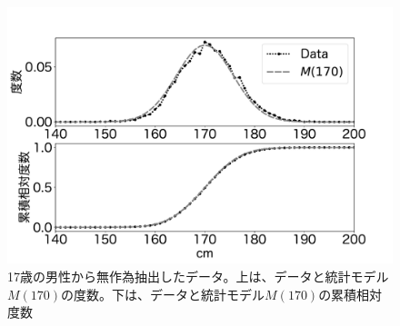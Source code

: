 \begin{figure}
\begin{center}
    \includegraphics[width=15cm]{./image/03_/cm_data.pdf}
    \caption{17歳の男性から無作為抽出したデータ。上は、データと統計モデル$M(170)$の度数。下は、データと統計モデル$M(170)$の累積相対度数}
    \label{fig:real_height_men}
\end{center}
\end{figure}


